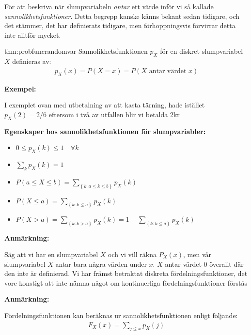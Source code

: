 \noindent För att beskriva när slumpvariabeln \textit{antar} ett värde inför vi så kallade \textit{sannolikhetsfunktioner}. Detta begrepp kanske känns bekant sedan tidigare, och det stämmer, det har definierats tidigare, men förhoppningsvis förvirrar detta inte alltför mycket.
\par\bigskip
\begin{theo}{thm:probfuncrandomvar}
  Sannolikhetsfunktionen $p_X$ för en diskret slumpvariabel $X$ definieras av:
  \begin{equation*}
    \begin{gathered}
      p_X(x) = P(X=x) = P(X \text{ antar värdet } x)
    \end{gathered}
  \end{equation*}
\end{theo}
\par\bigskip
\noindent\textbf{Exempel:}\par
\noindent I exemplet ovan med utbetalning av att kasta tärning, hade istället $p_X(2) = 2/6$ eftersom i två av utfallen blir vi betalda 2kr
\par\bigskip
\noindent\textbf{Egenskaper hos sannolikhetsfunktionen för slumpvariabler:}
\begin{itemize}
  \item $0\leq p_X(k)\leq1\quad\forall k$
  \item $\sum_kp_X(k) = 1$
  \item $P(a\leq X\leq b) = \sum_{\left\{k:a\leq k\leq b\right\}}p_X(k)$
  \item $P(X\leq a) = \sum_{\left\{k:k\leq a\right\}}p_X(k)$
  \item $P(X>a) = \sum_{\left\{k:k>a\right\}}p_X(k) = 1-\sum_{\left\{k:k\leq a\right\}}p_X(k)$
\end{itemize}
\par\bigskip
\noindent\textbf{Anmärkning:}\par
\noindent Säg att vi har en slumpvariabel $X$ och vi vill räkna $P_X(x)$, men vår slumpvariabel $X$ antar bara några värden under $x$. $X$ antar värdet 0 överallt där den inte är definierad. 
\noindent Vi har främst betraktat diskreta fördelningsfunktioner, det vore konstigt att inte nämna något om kontinuerliga fördelningsfunktioner förstås
\par\bigskip
\noindent\textbf{Anmärkning:}\par
\noindent Fördelningsfunktionen kan beräknas ur sannolikhetsfunktionen enligt följande:
\begin{equation*}
  \begin{gathered}
    F_X(x) = \sum_{j\leq x}p_X(j)
  \end{gathered}
\end{equation*}
